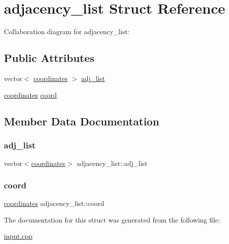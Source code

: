 \hypertarget{structadjacency__list}{}\section{adjacency\+\_\+list Struct Reference}
\label{structadjacency__list}


Collaboration diagram for adjacency\+\_\+list\+:
\subsection*{Public Attributes}
\begin{DoxyCompactItemize}
\item 
vector$<$ \hyperlink{structcoordinates}{coordinates} $>$ \hyperlink{structadjacency__list_a1597c7524394cfee124109aadd4efe4a}{adj\+\_\+list}
\item 
\hyperlink{structcoordinates}{coordinates} \hyperlink{structadjacency__list_aa1879f5cdc8b59e3ce1998aa93645dcf}{coord}
\end{DoxyCompactItemize}


\subsection{Member Data Documentation}
\mbox{\label{structadjacency__list_a1597c7524394cfee124109aadd4efe4a}} 
\subsubsection{\texorpdfstring{adj\+\_\+list}{adj\_list}}
{\footnotesize\ttfamily vector$<$\hyperlink{structcoordinates}{coordinates}$>$ adjacency\+\_\+list\+::adj\+\_\+list}

\mbox{\label{structadjacency__list_aa1879f5cdc8b59e3ce1998aa93645dcf}} 
\subsubsection{\texorpdfstring{coord}{coord}}
{\footnotesize\ttfamily \hyperlink{structcoordinates}{coordinates} adjacency\+\_\+list\+::coord}



The documentation for this struct was generated from the following file\+:\begin{DoxyCompactItemize}
\item 
\hyperlink{input_8cpp}{input.\+cpp}\end{DoxyCompactItemize}
